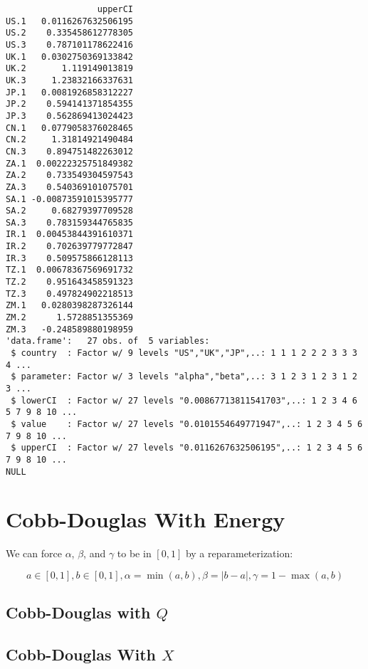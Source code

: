 \documentclass[preprint,authoryear,12pt]{elsarticle}\usepackage{graphicx, color}
\makeatletter
\newenvironment{kframe}{%
 \def\at@end@of@kframe{}%
 \ifinner\ifhmode%
  \def\at@end@of@kframe{\end{minipage}}%
  \begin{minipage}{\columnwidth}%
 \fi\fi%
 \def\FrameCommand##1{\hskip\@totalleftmargin \hskip-\fboxsep
 \colorbox{shadecolor}{##1}\hskip-\fboxsep
     \hskip-\linewidth \hskip-\@totalleftmargin \hskip\columnwidth}%
 \MakeFramed {\advance\hsize-\width
   \@totalleftmargin\z@ \linewidth\hsize
   \@setminipage}}%
 {\par\unskip\endMakeFramed%
 \at@end@of@kframe}
\newenvironment{knitrout}{}{} %
\makeatother
\begin{document}
\begin{knitrout}
\begin{kframe}
\begin{verbatim}
                  upperCI
US.1   0.0116267632506195
US.2    0.335458612778305
US.3    0.787101178622416
UK.1   0.0302750369133842
UK.2       1.119149013819
UK.3     1.23832166337631
JP.1   0.0081926858312227
JP.2    0.594141371854355
JP.3    0.562869413024423
CN.1   0.0779058376028465
CN.2     1.31814921490484
CN.3    0.894751482263012
ZA.1  0.00222325751849382
ZA.2    0.733549304597543
ZA.3    0.540369101075701
SA.1 -0.00873591015395777
SA.2     0.68279397709528
SA.3    0.783159344765835
IR.1  0.00453844391610371
IR.2    0.702639779772847
IR.3    0.509575866128113
TZ.1  0.00678367569691732
TZ.2    0.951643458591323
TZ.3    0.497824902218513
ZM.1   0.0280398287326144
ZM.2      1.5728851355369
ZM.3   -0.248589880198959
'data.frame':	27 obs. of  5 variables:
 $ country  : Factor w/ 9 levels "US","UK","JP",..: 1 1 1 2 2 2 3 3 3 4 ...
 $ parameter: Factor w/ 3 levels "alpha","beta",..: 3 1 2 3 1 2 3 1 2 3 ...
 $ lowerCI  : Factor w/ 27 levels "0.00867713811541703",..: 1 2 3 4 6 5 7 9 8 10 ...
 $ value    : Factor w/ 27 levels "0.0101554649771947",..: 1 2 3 4 5 6 7 9 8 10 ...
 $ upperCI  : Factor w/ 27 levels "0.0116267632506195",..: 1 2 3 4 5 6 7 9 8 10 ...
NULL
\end{verbatim}


{\ttfamily\noindent\bfseries\color{errorcolor}{Error: range not meaningful for factors}}\end{kframe}
\end{knitrout}





\section{Cobb-Douglas With Energy}

We can force $\alpha$, $\beta$, and $\gamma$ to be in $[0,1]$ by a reparameterization:

\[ a \in[0,1], b \in [0,1], \alpha=\min(a,b), \beta=|b-a|, \gamma = 1-\max(a,b) \]




\subsection{Cobb-Douglas with $Q$}







\subsection{Cobb-Douglas With $X$}
\end{document}
